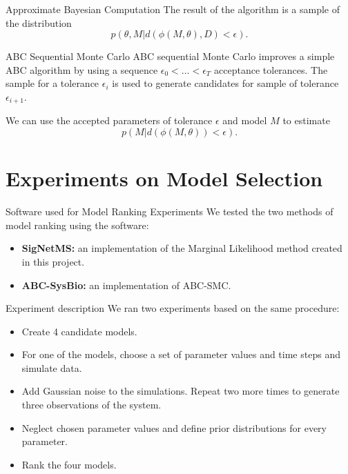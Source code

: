 \documentclass{beamer}
\begin{document}
\begin{frame}{Approximate Bayesian Computation}
The result of the algorithm is a sample of the distribution 
\begin{equation*}
p (\theta, M| d (\phi (M, \theta), D) < \epsilon).
\end{equation*}

\end{frame}

\begin{frame}{ABC Sequential Monte Carlo}
ABC sequential Monte Carlo improves a simple ABC algorithm by using a 
sequence $\epsilon_0 < \ldots < \epsilon_T$ acceptance tolerances. 
\pause The sample for a tolerance $\epsilon_i$ is used to generate 
candidates for sample of tolerance $\epsilon_{i + 1}$.

\pause
We can use the accepted parameters of tolerance $\epsilon$ and model $M$
to estimate 
\begin{equation*}
    p (M | d (\phi (M, \theta)) < \epsilon).
\end{equation*}
\end{frame}

\section{Experiments on Model Selection}

\begin{frame}{Software used for Model Ranking Experiments}
We tested the two methods of model ranking using the software:
\pause
\begin{itemize}
\item{{\bf SigNetMS:} an implementation of the Marginal Likelihood 
    method created in this project.}
\pause
\item{{\bf ABC-SysBio:} an implementation of ABC-SMC.}
\end{itemize}
\end{frame}


\begin{frame}{Experiment description}
We ran two experiments based on the same procedure:
\begin{itemize}
    \pause
    \item{Create 4 candidate models.}
    \pause
    \item{For one of the models, choose a set of parameter values 
        and time steps and simulate data.}
    \pause
    \item{Add Gaussian noise to the simulations. Repeat two more 
        times to generate three observations of the system.}
    \pause
    \item{Neglect chosen parameter values and define prior distributions
        for every parameter.}
    \pause
    \item{Rank the four models.}
\end{itemize}
\end{frame}
\end{document}
